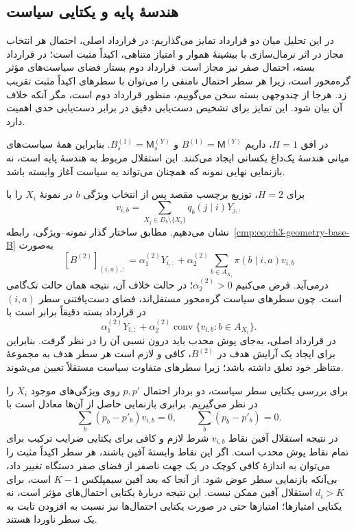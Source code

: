 \subsection{هندسهٔ پایه و یکتایی سیاست}
در این تحلیل میان دو قرارداد تمایز می‌گذاریم: در قرارداد اصلی، احتمال هر انتخاب مجاز در اثر نرمال‌سازی با بیشینهٔ هموار و امتیاز متناهی، اکیداً مثبت است؛ در قرارداد بسته، احتمال صفر نیز مجاز است. قرارداد دوم بستار فضای سیاست‌های مؤثر گره‌محور است، زیرا هر سطر احتمال نامنفی را می‌توان با سطرهای اکیداً مثبت تقریب زد. هرجا از چندوجهی بسته سخن می‌گوییم، منظور قرارداد دوم است، مگر آنکه خلاف آن بیان شود. این تمایز برای تشخیص دست‌یابی دقیق در برابر دست‌یابی حدی اهمیت دارد.

در افق $H=1$، داریم $B^{(1)}=\mathsf M^{(Y)}$ و $B_s^{(1)}=\mathsf M_s^{(Y)}$. بنابراین همهٔ سیاست‌های میانی هندسهٔ یک‌داغ یکسانی ایجاد می‌کنند. این استقلال مربوط به هندسهٔ پایه است، نه بازنمایی نهایی نمونه که همچنان می‌تواند به سیاست آغاز وابسته باشد.

برای $H=2$، توزیع برچسب مقصد پس از انتخاب ویژگی $b$ در نمونهٔ $X_i$ را با
\begin{equation}\label{cmp:eq:ch3-geometry-one-step-label}
v_{i,b}=\sum_{X_j\in D_b\setminus\{X_i\}}q_b(j\mid i)Y_{j,:}
\end{equation}
نشان می‌دهیم. مطابق ساختار گذار نمونه--ویژگی، رابطه~\eqref{cmp:eq:ch3-geometry-base-B} به‌صورت
\begin{equation}\label{cmp:eq:ch3-geometry-B-H2}
[B^{(2)}]_{(i,a),:}=\alpha_1^{(2)}Y_{i,:}+\alpha_2^{(2)}\sum_{b\in A_{X_i}}\pi(b\mid i,a)v_{i,b}
\end{equation}
درمی‌آید. فرض می‌کنیم $\alpha_2^{(2)}>0$؛ در حالت خلاف آن، نتیجه همان حالت تک‌گامی است. چون سطرهای سیاست گره‌محور مستقل‌اند، فضای دست‌یافتنی سطر $(i,a)$ در قرارداد بسته دقیقاً برابر است با
\begin{equation}\label{cmp:eq:ch3-geometry-B-H2-hull}
\alpha_1^{(2)}Y_{i,:}+\alpha_2^{(2)}\operatorname{conv}\{v_{i,b}:b\in A_{X_i}\}.
\end{equation}
در قرارداد اصلی، به‌جای پوش محدب باید درون نسبی آن را در نظر گرفت. بنابراین برای ایجاد یک آرایش هدف در $B^{(2)}$، کافی و لازم است هر سطر هدف به مجموعهٔ متناظر خود تعلق داشته باشد؛ زیرا سطرهای متفاوت سیاست مستقلاً تعیین می‌شوند.

برای بررسی یکتایی سطر سیاست، دو بردار احتمال $p,p'$ روی ویژگی‌های موجود $X_i$ را در نظر می‌گیریم. برابری بازنمایی حاصل از آن‌ها معادل است با
\[
\sum_b(p_b-p'_b)v_{i,b}=0,\qquad \sum_b(p_b-p'_b)=0.
\]
در نتیجه استقلال آفین نقاط $v_{i,b}$ شرط لازم و کافی برای یکتایی ضرایب ترکیب برای تمام نقاط پوش محدب است. اگر این نقاط وابستهٔ آفین باشند، هر سطر اکیداً مثبت را می‌توان به اندازهٔ کافی کوچک در یک جهت ناصفر از فضای صفر دستگاه تغییر داد، بی‌آنکه بازنمایی سطر عوض شود. از آنجا که بعد آفین سیمپلکس $K-1$ است، برای $d_i>K$ استقلال آفین ممکن نیست. این نتیجه دربارهٔ یکتایی احتمال‌های مؤثر است، نه یکتایی امتیازها؛ امتیازها حتی در صورت یکتایی احتمال‌ها نیز نسبت به افزودن ثابت به یک سطر ناوردا هستند.

